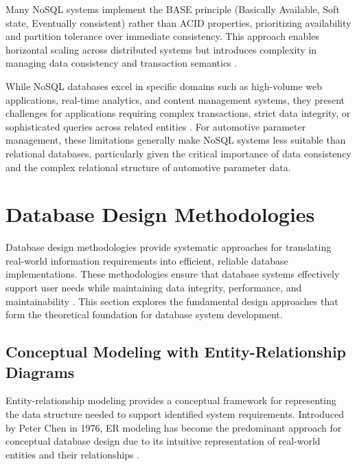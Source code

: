 Many NoSQL systems implement the BASE principle (Basically Available, Soft state, Eventually consistent) rather than ACID properties, prioritizing availability and partition tolerance over immediate consistency. This approach enables horizontal scaling across distributed systems but introduces complexity in managing data consistency and transaction semantics \cite{kleppmann2017conflict}.

While NoSQL databases excel in specific domains such as high-volume web applications, real-time analytics, and content management systems, they present challenges for applications requiring complex transactions, strict data integrity, or sophisticated queries across related entities \cite{meier2019sql}. For automotive parameter management, these limitations generally make NoSQL systems less suitable than relational databases, particularly given the critical importance of data consistency and the complex relational structure of automotive parameter data.

\section{Database Design Methodologies}
\label{sec:database-design-methodologies}

Database design methodologies provide systematic approaches for translating real-world information requirements into efficient, reliable database implementations. These methodologies ensure that database systems effectively support user needs while maintaining data integrity, performance, and maintainability \cite{chen1976entity}. This section explores the fundamental design approaches that form the theoretical foundation for database system development.

\subsection{Conceptual Modeling with Entity-Relationship Diagrams}
\label{subsec:conceptual-modeling}

Entity-relationship modeling provides a conceptual framework for representing the data structure needed to support identified system requirements. Introduced by Peter Chen in 1976, \ac{ER} modeling has become the predominant approach for conceptual database design due to its intuitive representation of real-world entities and their relationships \cite{chen1976entity}.

